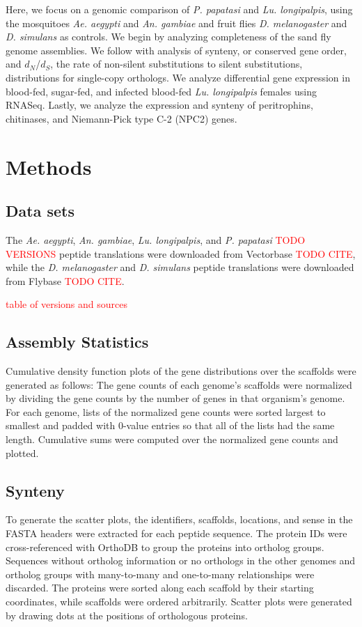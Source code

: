 Here, we focus on a genomic comparison of \emph{P. papatasi} and \emph{Lu. longipalpis}, using the mosquitoes \emph{Ae. aegypti} and \emph{An. gambiae} and fruit flies \emph{D. melanogaster} and \emph{D. simulans} as controls.  We begin by analyzing completeness of the sand fly genome assemblies.  We follow with analysis of synteny, or conserved gene order, and $d_N$/$d_S$, the rate of non-silent substitutions to silent substitutions, distributions for single-copy orthologs.  We analyze differential gene expression in blood-fed, sugar-fed, and infected blood-fed \emph{Lu. longipalpis} females using RNASeq.  Lastly, we analyze the expression and synteny of peritrophins, chitinases, and Niemann-Pick type C-2 (NPC2) genes.

\section{Methods}

\subsection{Data sets}
The \emph{Ae. aegypti}, \emph{An. gambiae}, \emph{Lu. longipalpis}, and \emph{P. papatasi} \textcolor{red}{TODO VERSIONS} peptide translations were downloaded from Vectorbase \textcolor{red}{TODO CITE}, while the \emph{D. melanogaster} and \emph{D. simulans} peptide translations were downloaded from Flybase \textcolor{red}{TODO CITE}.

\textcolor{red}{table of versions and sources}

\subsection{Assembly Statistics}
Cumulative density function plots of the gene distributions over the scaffolds were generated as follows: The gene counts of each genome's scaffolds were normalized by dividing the gene counts by the number of genes in that organism's genome. For each genome, lists of the normalized gene counts were sorted largest to smallest and padded with 0-value entries so that all of the lists had the same length.  Cumulative sums were computed over the normalized gene counts and plotted.


\subsection{Synteny}
To generate the scatter plots, the identifiers, scaffolds, locations, and sense in the FASTA headers were extracted for each peptide sequence.  The protein IDs were cross-referenced with OrthoDB to group the proteins into ortholog groups.  Sequences without ortholog information or no orthologs in the other genomes and ortholog groups with many-to-many and one-to-many relationships were discarded.  The proteins were sorted along each scaffold by their starting coordinates, while scaffolds were ordered arbitrarily.  Scatter plots were generated by drawing dots at the positions of orthologous proteins.

